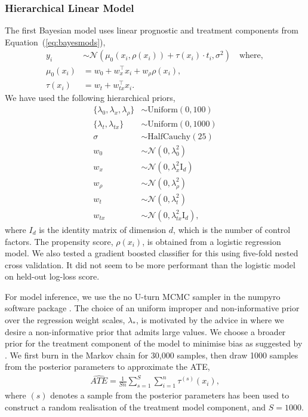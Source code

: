 \documentclass[12pt, a4paper]{article}
\begin{document}
\subsubsection*{Hierarchical Linear Model}

The first Bayesian model uses linear prognostic and treatment components 
from Equation~(\ref{eq:bayesmods}),
\begin{align*}
y_i &\sim \mathcal{N}\!\left(
  \mu_0(x_i, \rho(x_i)) + \tau(x_i)\cdot t_i, 
  \sigma^2\right) 
  \quad\textrm{where}, \\
\mu_0(x_i) &= w_0 + w_x^\top x_i + w_\rho \rho(x_i), \\
\tau(x_i) &= w_t + w_{tx}^\top x_i.
\end{align*}
We have used the following hierarchical priors,
\begin{align*}
  \{\lambda_0, \lambda_x, \lambda_\rho\} &\sim \textrm{Uniform}(0, 100) \\
  \{\lambda_t, \lambda_{tx}\} &\sim \textrm{Uniform}(0, 1000) \\
  \sigma &\sim \textrm{HalfCauchy}(25) \\
  w_0 &\sim \mathcal{N}(0,\lambda_0^2) \\
  w_x &\sim \mathcal{N}(0,\lambda_x^2 \textrm{I}_d) \\
  w_\rho &\sim \mathcal{N}(0,\lambda_\rho^2) \\
  w_t &\sim \mathcal{N}(0,\lambda_t^2) \\
  w_{tx} &\sim \mathcal{N}(0,\lambda^2_{tx} \textrm{I}_d),
\end{align*}
where $I_d$ is the identity matrix of dimension $d$, which is the number of
control factors. The propensity score, $\rho(x_i)$, is obtained from a logistic
regression model. We also tested a gradient boosted classifier
\citep{friedman2001} for this using five-fold nested cross validation.  It did
not seem to be more performant than the logistic model on held-out log-loss
score.

For model inference, we use the no U-turn MCMC sampler \citep{hoffman2014} in
the numpyro software package \citep{bingham2019, phan2019}. The choice of an
uniform improper and non-informative prior over the regression weight scales,
$\lambda_*$, is motivated by the advice in \citet{gelman2006} where we desire a
non-informative prior that admits large values. We choose a broader 
prior for the treatment component of the model to minimise bias as suggested by
\cite{hahn2020}. We first burn in the Markov chain for 30,000 samples, then draw
1000 samples from the posterior parameters to approximate the ATE,
\begin{align*}
  \hat{ATE} = \frac{1}{Sn} \sum^S_{s=1} \sum^n_{i=1} \tau^{(s)}(x_i),
\end{align*}
where $(s)$ denotes a sample from the posterior parameters has been used to 
construct a random realisation of the treatment model component, and $S = 1000$.
\end{document}
